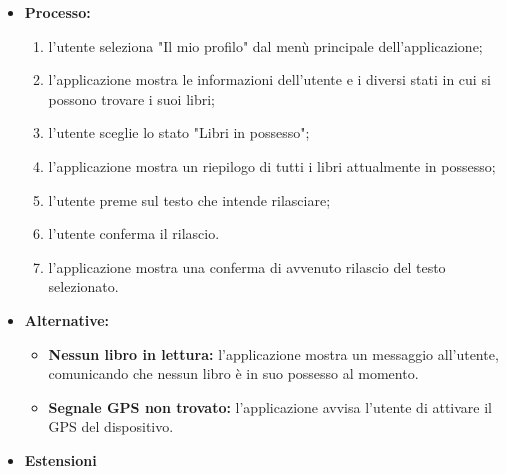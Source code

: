 \begin{itemize}
\begin{itemize}
		\item \textbf{Processo:}
		\begin{enumerate}
			\item l'utente seleziona "Il mio profilo" dal menù principale dell'applicazione;
			\item l'applicazione mostra le informazioni dell'utente e i diversi stati in cui si possono trovare i suoi libri;
			\item l'utente sceglie lo stato "Libri in possesso";
			\item l'applicazione mostra un riepilogo di tutti i libri attualmente in possesso;
			\item l'utente preme sul testo che intende rilasciare;
			\item l'utente conferma il rilascio.
			\item l'applicazione mostra una conferma di avvenuto rilascio del testo selezionato.
		\end{enumerate}
		\item \textbf{Alternative:}
		\begin{itemize}
			\item \textbf{Nessun libro in lettura:} l'applicazione mostra un messaggio all'utente, comunicando che nessun libro è in suo possesso al momento.
			\item \textbf{Segnale GPS non trovato:} l'applicazione avvisa l'utente di attivare il GPS del dispositivo.
		\end{itemize}
		\item \textbf{Estensioni}
	\end{itemize}
\end{itemize}